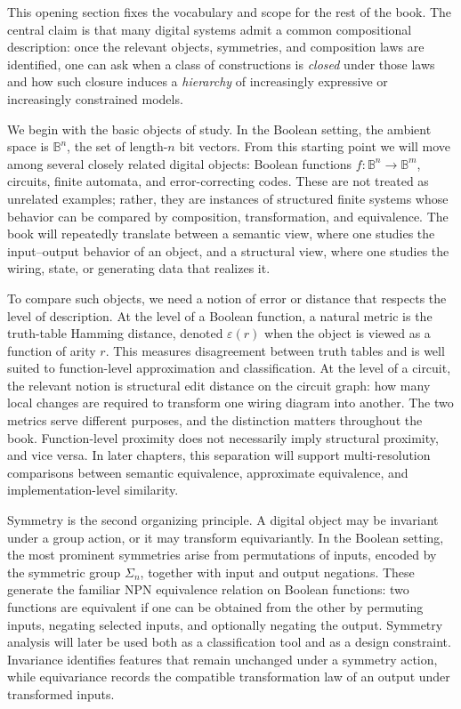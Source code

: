 \documentclass[11pt]{article}
\begin{document}

This opening section fixes the vocabulary and scope for the rest of the book. The central claim is that many digital systems admit a common compositional description: once the relevant objects, symmetries, and composition laws are identified, one can ask when a class of constructions is \emph{closed} under those laws and how such closure induces a \emph{hierarchy} of increasingly expressive or increasingly constrained models.

We begin with the basic objects of study. In the Boolean setting, the ambient space is \(\mathbb{B}^n\), the set of length-\(n\) bit vectors. From this starting point we will move among several closely related digital objects: Boolean functions \(f : \mathbb{B}^n \to \mathbb{B}^m\), circuits, finite automata, and error-correcting codes. These are not treated as unrelated examples; rather, they are instances of structured finite systems whose behavior can be compared by composition, transformation, and equivalence. The book will repeatedly translate between a semantic view, where one studies the input--output behavior of an object, and a structural view, where one studies the wiring, state, or generating data that realizes it.

To compare such objects, we need a notion of error or distance that respects the level of description. At the level of a Boolean function, a natural metric is the truth-table Hamming distance, denoted \(\varepsilon(r)\) when the object is viewed as a function of arity \(r\). This measures disagreement between truth tables and is well suited to function-level approximation and classification. At the level of a circuit, the relevant notion is structural edit distance on the circuit graph: how many local changes are required to transform one wiring diagram into another. The two metrics serve different purposes, and the distinction matters throughout the book. Function-level proximity does not necessarily imply structural proximity, and vice versa. In later chapters, this separation will support multi-resolution comparisons between semantic equivalence, approximate equivalence, and implementation-level similarity.

Symmetry is the second organizing principle. A digital object may be invariant under a group action, or it may transform equivariantly. In the Boolean setting, the most prominent symmetries arise from permutations of inputs, encoded by the symmetric group \(\Sigma_n\), together with input and output negations. These generate the familiar \(\mathrm{NPN}\) equivalence relation on Boolean functions: two functions are equivalent if one can be obtained from the other by permuting inputs, negating selected inputs, and optionally negating the output. Symmetry analysis will later be used both as a classification tool and as a design constraint. Invariance identifies features that remain unchanged under a symmetry action, while equivariance records the compatible transformation law of an output under transformed inputs.
\end{document}

